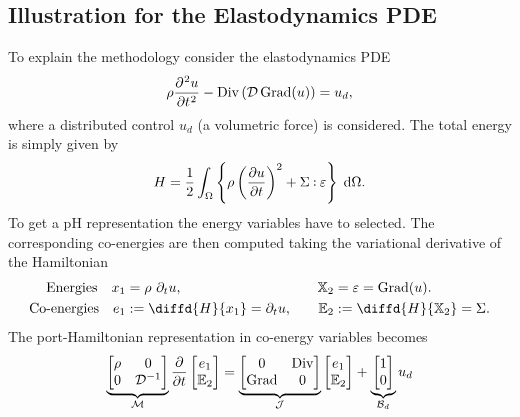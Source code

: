 \subsection{Illustration for the Elastodynamics PDE}
To explain the methodology consider the elastodynamics PDE
\begin{equation*}
\rho \diffp[2]{u}{t} - \Div\left(\mathcal{D} \Grad(u)\right) = u_d,
\end{equation*}
where a distributed control $u_d$ (a volumetric force) is considered.
The total energy is simply given by 
\[\displaystyle H = \frac{1}{2} \int_{\Omega} \left\{\rho \left(\diffp{u}{t}\right)^2 + \Sigma \cddot \varepsilon \right\} \d{\Omega}.
\]
To get a pH representation the energy variables have to selected. The corresponding co-energies are then computed taking the variational derivative of the Hamiltonian
\begin{equation}
\begin{aligned}
\text{Energies} \quad  x_1 &= \rho \ \partial_t {u}, \\
\text{Co-energies} \quad e_1 &:= \diffd{H}{x_1} =  \partial_t {u}, \\
\end{aligned} \qquad
\begin{aligned}
\mathbb{X}_2 &= \varepsilon = \Grad(u). \\
\mathbb{E}_2 &:= \diffd{H}{\mathbb{X}_2} = \Sigma.
\end{aligned}
\end{equation}
The port-Hamiltonian representation in co-energy variables becomes
\begin{equation*}
\underbrace{\begin{bmatrix}
\rho & 0 \\ 0 & \mathcal{D}^{-1} \\
\end{bmatrix}}_{\mathcal{M}}
\diffp{}{t}
\begin{bmatrix}
e_1 \\ \mathbb{E}_2 \\
\end{bmatrix} = 
\underbrace{\begin{bmatrix}
0 & \Div \\ \Grad & 0 \\
\end{bmatrix}}_{\mathcal{J}}
\begin{bmatrix}
e_1 \\ \mathbb{E}_2 \\
\end{bmatrix} + 
\underbrace{\begin{bmatrix}
1 \\ 0 \\
\end{bmatrix}}_{\mathcal{B}_d} u_d 
\end{equation*}
